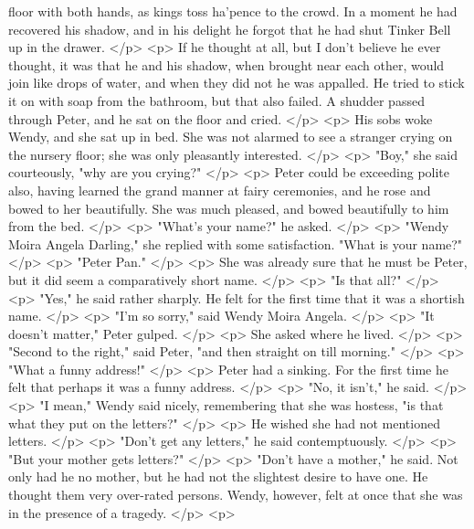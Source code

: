       floor with both hands, as kings toss ha'pence to the crowd. In a moment he
      had recovered his shadow, and in his delight he forgot that he had shut
      Tinker Bell up in the drawer.
    </p>
    <p>
      If he thought at all, but I don't believe he ever thought, it was that he
      and his shadow, when brought near each other, would join like drops of
      water, and when they did not he was appalled. He tried to stick it on with
      soap from the bathroom, but that also failed. A shudder passed through
      Peter, and he sat on the floor and cried.
    </p>
    <p>
      His sobs woke Wendy, and she sat up in bed. She was not alarmed to see a
      stranger crying on the nursery floor; she was only pleasantly interested.
    </p>
    <p>
      "Boy," she said courteously, "why are you crying?"
    </p>
    <p>
      Peter could be exceeding polite also, having learned the grand manner at
      fairy ceremonies, and he rose and bowed to her beautifully. She was much
      pleased, and bowed beautifully to him from the bed.
    </p>
    <p>
      "What's your name?" he asked.
    </p>
    <p>
      "Wendy Moira Angela Darling," she replied with some satisfaction. "What is
      your name?"
    </p>
    <p>
      "Peter Pan."
    </p>
    <p>
      She was already sure that he must be Peter, but it did seem a
      comparatively short name.
    </p>
    <p>
      "Is that all?"
    </p>
    <p>
      "Yes," he said rather sharply. He felt for the first time that it was a
      shortish name.
    </p>
    <p>
      "I'm so sorry," said Wendy Moira Angela.
    </p>
    <p>
      "It doesn't matter," Peter gulped.
    </p>
    <p>
      She asked where he lived.
    </p>
    <p>
      "Second to the right," said Peter, "and then straight on till morning."
    </p>
    <p>
      "What a funny address!"
    </p>
    <p>
      Peter had a sinking. For the first time he felt that perhaps it was a
      funny address.
    </p>
    <p>
      "No, it isn't," he said.
    </p>
    <p>
      "I mean," Wendy said nicely, remembering that she was hostess, "is that
      what they put on the letters?"
    </p>
    <p>
      He wished she had not mentioned letters.
    </p>
    <p>
      "Don't get any letters," he said contemptuously.
    </p>
    <p>
      "But your mother gets letters?"
    </p>
    <p>
      "Don't have a mother," he said. Not only had he no mother, but he had not
      the slightest desire to have one. He thought them very over-rated persons.
      Wendy, however, felt at once that she was in the presence of a tragedy.
    </p>
    <p>
